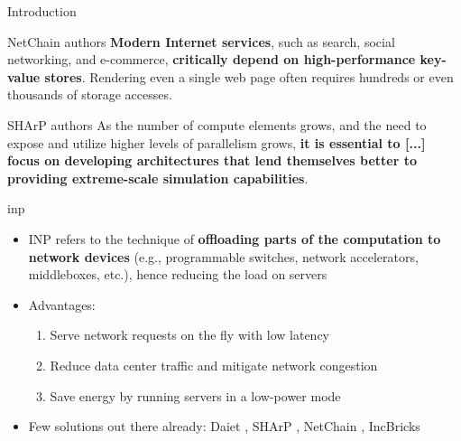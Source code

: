 \begin{frame}[fragile]{Introduction}

    \vspace{5mm}

    \begin{aquote}{NetChain \cite{netchain} authors}
        \textbf{Modern Internet services}, such as search, social networking, and e-commerce, \textbf{critically depend on high-performance key-value stores}. Rendering even a single web page often requires hundreds or even thousands of storage accesses.
    \end{aquote}

    \vspace{7mm}

    \begin{aquote}{SHArP \cite{sharp} authors}
        As the number of compute elements grows, and the need to expose and utilize higher levels of parallelism grows, \textbf{it is essential to [...] focus on developing architectures that lend themselves better to providing extreme-scale simulation capabilities}.
    \end{aquote}
\end{frame}

\begin{frame}[fragile]{\gls*{inp}}
    \begin{itemize}
        \item INP refers to the technique of \textbf{offloading parts of the computation to network devices} (e.g., programmable switches, network accelerators, middleboxes, etc.), hence reducing the load on servers
        \item Advantages:
        \begin{enumerate} %
            \item Serve network requests on the fly with low latency
            \item Reduce data center traffic and mitigate network congestion
            \item Save energy by running servers in a low-power mode
        \end{enumerate}
        \item Few solutions out there already: Daiet \cite{daiet}, SHArP \cite{sharp}, NetChain \cite{netchain}, IncBricks \cite{incbricks}
    \end{itemize}
\end{frame}

